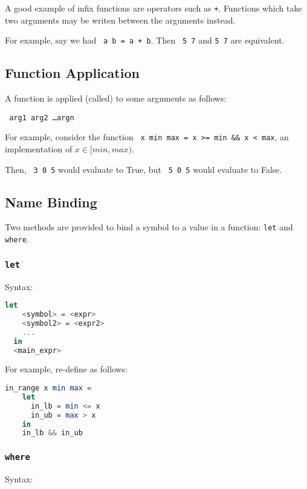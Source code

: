 A good example of infix functions are operators such as \texttt{+}. Functions which take two arguments may be writen between the arguments instead.

For example, say we had \texttt{ a b = a + b}. Then \texttt{ 5 7} and \texttt{5  7} are equivalent.

\subsection{Function Application}

A function is applied (called) to some arguments as follows:

\begin{center}
  \texttt{ arg1 arg2 \ldots argn}
\end{center}

For example, consider the function \texttt{ x min max = x >= min \&\& x < max}, an implementation of $x \in [min, max)$.

Then, \texttt{ 3 0 5} would evaluate to True, but \texttt{ 5 0 5} would evaluate to False.

\subsection{Name Binding}
Two methods are provided to bind a symbol to a value in a function: \texttt{let} and \texttt{where}.

\subsubsection{\texttt{let}}
Syntax:
\begin{lstlisting}[language=haskell]
  let
    <symbol> = <expr>
    <symbol2> = <expr2>
    ...
  in
  <main_expr>
\end{lstlisting}

For example, re-define \texttt{} as follows:

\begin{lstlisting}[language=haskell]
  in_range x min max =
    let
      in_lb = min <= x
      in_ub = max > x
    in
    in_lb && in_ub
\end{lstlisting}

\subsubsection{\texttt{where}}
Syntax:

